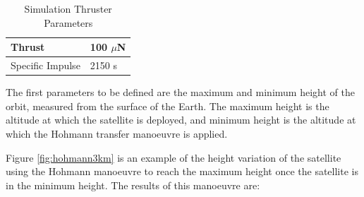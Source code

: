 \begin{table}[h!]
\begin{center}
\begin{tabular}{ | l | l | }
\hline
Thrust & 100 $\mu$N \\ 
\hline 
Specific Impulse & 2150 s \\
\hline
\end{tabular}
\caption{Simulation Thruster Parameters}
\label{thrustspimpulse}
\end{center}
\end{table}

The first parameters to be defined are the maximum and minimum height of the orbit, measured from the surface of the Earth. The maximum height is the altitude at which the satellite is deployed, and minimum height is the altitude at which the Hohmann transfer manoeuvre is applied.

Figure \ref{fig:hohmann3km} is an example of the height variation of the satellite using the Hohmann manoeuvre to reach the maximum height once the satellite is in the minimum height. The results of this manoeuvre are:

